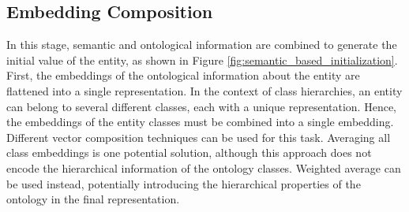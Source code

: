 \subsection{Embedding Composition} \label{subsec:s4_embedding_compo}
In this stage, semantic and ontological information are combined to generate the initial value of the entity, as shown in Figure \ref{fig:semantic_based_initialization}. First, the embeddings of the ontological information about the entity are flattened into a single representation. In the context of class hierarchies, an entity can belong to several different classes, each with a unique representation. Hence, the embeddings of the entity classes must be combined into a single embedding. Different vector composition techniques can be used for this task. Averaging all class embeddings is one potential solution, although this approach does not encode the hierarchical information of the ontology classes. Weighted average can be used instead, potentially introducing the hierarchical properties of the ontology in the final representation.

